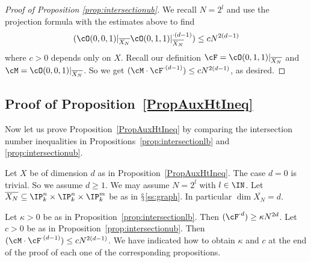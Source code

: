 \begin{proof}[Proof of Proposition \ref{prop:intersectionub}]
We recall $N=2^l$ and use the projection formula with the estimates
above to find
\begin{equation*}
  (\cO(0,0,1)|_{\overline{X_N}}
  \cO(0,1,1)|_{\overline{X_N}}^{\cdot(d-1)}) \le  c N^{2(d-1)}
\end{equation*}
where $c>0$ depends only on $X$.
Recall our definition $\cF = \cO(0,1,1)|_{\overline{X_N}}$ and $\cM =
\cO(0,0,1)|_{\overline{X_N}}$. So we get
$  (\cM\cdot \cF^{\cdot(d-1)}) \le c N^{2(d-1)}$, as desired.
%
%
\end{proof}


\subsection{Proof of Proposition~\ref{PropAuxHtIneq}}\label{SubsectionProofOfAUxHtIneq}
Now let us prove Proposition~\ref{PropAuxHtIneq} by comparing the intersection number inequalities in
Propositions~\ref{prop:intersectionlb} and \ref{prop:intersectionub}.

Let $X$ be of dimension $d$ as in Proposition~\ref{PropAuxHtIneq}. The
case $d = 0$ is trivial. So we assume $d \ge 1$. We may assume $N=2^l$
with $l \in \IN$. Let $\overline{X_N} \subseteq \IP_k^n \times \IP_k^n \times \IP_k^m$ be as in $\mathsection$\ref{ss:graph}. In particular $\dim \overline{X_N} = d$.

Let $\kappa > 0$ be as in Proposition~\ref{prop:intersectionlb}. Then
$(\cF^{\cdot d}) \ge \kappa N^{2d}$. Let $c > 0$ be as in
Proposition~\ref{prop:intersectionub}. Then $(\cM \cdot \cF^{\cdot
(d-1)}) \le c N^{2(d-1)}$.
We have indicated how to obtain  $\kappa$ and $c$  at the end of the proof of each one of the corresponding propositions.

